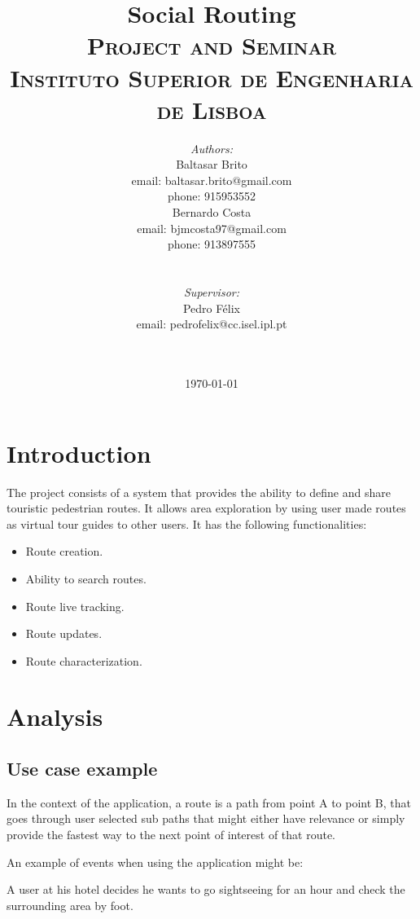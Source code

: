 \documentclass{article}
\title{
    \vspace{-4.0cm}
    {\Huge Social Routing}\\[0.5cm]    
    \textsc{\Large Project and Seminar}\\[0.5cm]
    \textsc{\large Instituto Superior de Engenharia de Lisboa}\\[0.5cm]
}
\date{\today}
\author{   
    \begin{minipage}{0.4\textwidth}
        \begin{flushleft} \large
        \emph{Authors:}\\
        Baltasar Brito\\
        {\small email: baltasar.brito@gmail.com}\\
        {\small phone: 915953552}\\
        Bernardo Costa\\
        {\small email: bjmcosta97@gmail.com}\\
        {\small phone: 913897555}\\
        \end{flushleft}
    \end{minipage}
    ~
    \begin{minipage}{0.4\textwidth}
        \begin{flushright} \large
        \emph{Supervisor:} \\ 
        Pedro Félix\\
        {\small email: pedrofelix@cc.isel.ipl.pt}\\  
        \end{flushright}
    \end{minipage}\\[2cm]  
}
\begin{document}
     
    
    \maketitle
 
    \section{Introduction} 

        The project consists of a system that provides the ability to define and share touristic pedestrian routes. It allows
        area exploration by using user made routes as virtual tour guides to other users. It has the following functionalities:
        \begin{itemize}
            \item Route creation.
            \item Ability to search routes.
            \item Route live tracking.
            \item Route updates.
            \item Route characterization.
        \end{itemize}
    


    \newpage
    

    \section{Analysis}

        \subsection{Use case example}
            In the context of the application, a route is a path from point A to point B, that goes through user selected sub paths
            that might either have relevance or simply provide the fastest way to the next point of interest of that route. 

            An example of events when using the application might be:

            A user at his hotel decides he wants to go sightseeing for an hour and check the surrounding area by foot.
        
\end{document}
